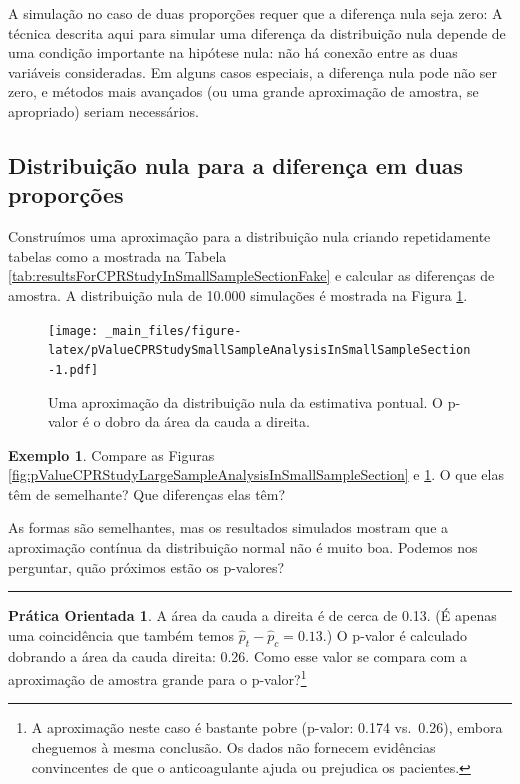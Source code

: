 \documentclass[
]{book}
\theoremstyle{definition}
\theoremstyle{definition}
\newtheorem{example}{Exemplo}[chapter]
\theoremstyle{definition}
\newtheorem{exercise}{Prática Orientada}[chapter]
\theoremstyle{definition}
\theoremstyle{remark}
\begin{document}
A simulação no caso de duas proporções requer que a diferença nula seja zero: A técnica descrita aqui para simular uma diferença da distribuição nula depende de uma condição importante na hipótese nula: não há conexão entre as duas variáveis consideradas. Em alguns casos especiais, a diferença nula pode não ser zero, e métodos mais avançados (ou uma grande aproximação de amostra, se apropriado) seriam necessários.

\hypertarget{nullDistributionDifferenceTwoProportions}{%
\subsection{Distribuição nula para a diferença em duas proporções}\label{nullDistributionDifferenceTwoProportions}}

Construímos uma aproximação para a distribuição nula criando repetidamente tabelas como a mostrada na Tabela \ref{tab:resultsForCPRStudyInSmallSampleSectionFake} e calcular as diferenças de amostra. A distribuição nula de 10.000 simulações é mostrada na Figura \ref{fig:pValueCPRStudySmallSampleAnalysisInSmallSampleSection}.

\begin{figure}
\centering
\texttt{[image: \_main\_files/figure-latex/pValueCPRStudySmallSampleAnalysisInSmallSampleSection-1.pdf]}
\caption{\label{fig:pValueCPRStudySmallSampleAnalysisInSmallSampleSection}Uma aproximação da distribuição nula da estimativa pontual. O p-valor é o dobro da área da cauda a direita.}
\end{figure}

\begin{example}
\protect\hypertarget{exm:unnamed-chunk-266}{}{\label{exm:unnamed-chunk-266} }Compare as Figuras \ref{fig:pValueCPRStudyLargeSampleAnalysisInSmallSampleSection} e \ref{fig:pValueCPRStudySmallSampleAnalysisInSmallSampleSection}. O que elas têm de semelhante? Que diferenças elas têm?
\end{example}

As formas são semelhantes, mas os resultados simulados mostram que a aproximação contínua da distribuição normal não é muito boa. Podemos nos perguntar, quão próximos estão os p-valores?

\begin{center}\rule{0.5\linewidth}{0.5pt}\end{center}

\begin{exercise}
\protect\hypertarget{exr:comparisonOfLargeSampleAndSmallSamplePValueInCPRStudy}{}{\label{exr:comparisonOfLargeSampleAndSmallSamplePValueInCPRStudy} }A área da cauda a direita é de cerca de 0.13. (É apenas uma coincidência que também temos \(\hat{p}_t - \hat{p}_c = 0.13\).) O p-valor é calculado dobrando a área da cauda direita: 0.26. Como esse valor se compara com a aproximação de amostra grande para o p-valor?\footnote{A aproximação neste caso é bastante pobre (p-valor: 0.174 vs.~0.26), embora cheguemos à mesma conclusão. Os dados não fornecem evidências convincentes de que o anticoagulante ajuda ou prejudica os pacientes.}
\end{exercise}
\end{document}
